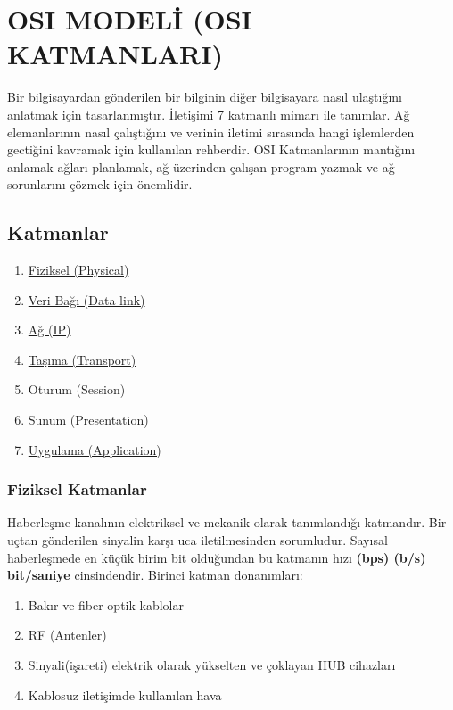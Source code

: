 \section{OSI MODELİ (OSI KATMANLARI)}
\tab Bir bilgisayardan gönderilen bir bilginin diğer bilgisayara nasıl ulaştığını anlatmak için tasarlanmıştır.
İletişimi 7 katmanlı mimarı ile tanımlar.
Ağ elemanlarının nasıl çalıştığını ve verinin iletimi sırasında hangi işlemlerden gectiğini kavramak için kullanılan rehberdir.
OSI Katmanlarının mantığını anlamak ağları planlamak, ağ üzerinden çalışan program yazmak ve ağ sorunlarını çözmek için önemlidir.

\subsection{Katmanlar}
\begin{enumerate}
	\item \hyperref[subsubsec:fiziksel_katmanlar]{ Fiziksel (Physical)}
	\item \hyperref[subsubsec:veri_bagi_katmani]{Veri Bağı (Data link)}
	\item \hyperref[subsubsec:ag_katmani]{Ağ (IP)}
	\item \hyperref[subsubsec:tasima_katmani]{Taşıma (Transport)}
	\item Oturum (Session)
	\item Sunum (Presentation)
	\item \hyperref[subsubsec:tasima_katmani]{Uygulama (Application)}
\end{enumerate}

\subsubsection{Fiziksel Katmanlar}\label{subsubsec:fiziksel_katmanlar}
\tab Haberleşme kanalının elektriksel ve mekanik olarak tanımlandığı katmandır.
Bir uçtan gönderilen sinyalin karşı uca iletilmesinden sorumludur.
Sayısal haberleşmede en küçük birim bit olduğundan bu katmanın hızı \textbf{(bps) (b/s) bit/saniye} cinsindendir.
Birinci katman donanımları:
\begin{enumerate}
	\item Bakır ve fiber optik kablolar
	\item RF (Antenler)
	\item Sinyali(işareti) elektrik olarak yükselten ve çoklayan HUB cihazları
	\item Kablosuz iletişimde kullanılan hava
\end{enumerate}


